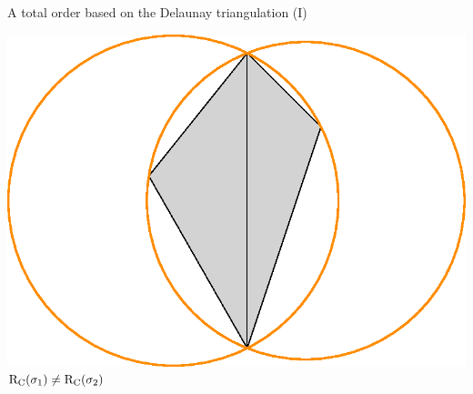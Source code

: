 \begin{frame}[c]{A total order based on the Delaunay triangulation (I)}
\begin{center}
\begin{minipage}{0.5\linewidth}
			\includegraphics[height=0.3\textheight]{order_rcirc}\\
			\color{pathorange} $\operatorname{R_C}(\sigma_1) \neq \operatorname{R_C}(\sigma_2)$
		\end{minipage}%
	\end{center}
\end{frame}

